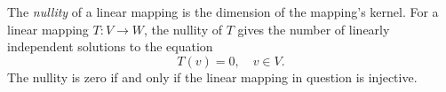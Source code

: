\documentclass{article}
\begin{document}
The \emph{nullity} of a linear mapping is the dimension of the mapping's kernel.
For a linear mapping $T:V\rightarrow W$, the nullity of $T$ gives the
number of linearly independent solutions to the equation
$$T(v)=0,\quad v\in V.$$
The nullity is zero if and only if the linear
mapping in question is injective.
\end{document}
